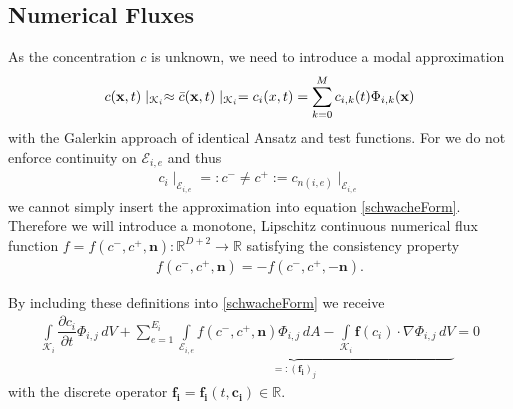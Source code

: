 		\subsection{Numerical Fluxes}
		
		As the concentration $c$ is unknown, we need to introduce a modal approximation
		\begin{align}
			c(\mathbf{x} , t)\mid _{\mathcal{K}_i} \approx \bar{c} (\mathbf{x} , t)\mid _{\mathcal{K}_i} = c_i (\boldmath{x} , t) = \sum_{k = 0}^{M}c_{i,k}(t) \Phi_{i,k}(\mathbf{x})
		\end{align}
		with the Galerkin approach of identical Ansatz and test functions. 
		For we do not enforce continuity on $\mathcal{E}_{i,e}$ and thus 
		\begin{align}
			c_i \mid_{\mathcal{E}_{i,e}}=: c^- \neq c^+ := c_{n(i,e)} \mid_{\mathcal{E}_{i,e}}
		\end{align}
		we cannot simply insert the approximation into equation \eqref{schwacheForm}.
		Therefore we will introduce a monotone, Lipschitz continuous numerical flux function $f = f(c^-, c^+, \mathbf{n}):\mathbb{R}^{D+2}\rightarrow\mathbb{R}$ satisfying the consistency property
		\begin{align}
			f(c^-, c^+, \mathbf{n}) = - f(c^-, c^+, -\mathbf{n}).
		\end{align}
		
		By including these definitions into \eqref{schwacheForm} we receive
		\begin{align}
			\int\limits_{\mathcal{K}_i} \dfrac{\partial c_i}{\partial t}\Phi_{i,j} \, dV +
			\underbrace{\sum_{e=1}^{E_i}\int\limits_{\mathcal{E}_{i,e}} f \left( c^-, c^+, \mathbf{n} \right) \Phi_{i,j} \, dA - \int\limits_{\mathcal{K}_i} \boldsymbol{f}\left(c_i\right) \cdot \nabla\Phi_{i,j} \, dV}_{=:(\mathbf{f_i})_j} = 0
			\label{schwacheFormFlux}
		\end{align}
		with the discrete operator $\mathbf{f_i}=\mathbf{f_i}(t, \mathbf{c_i})\in\mathbb{R}$.
		
